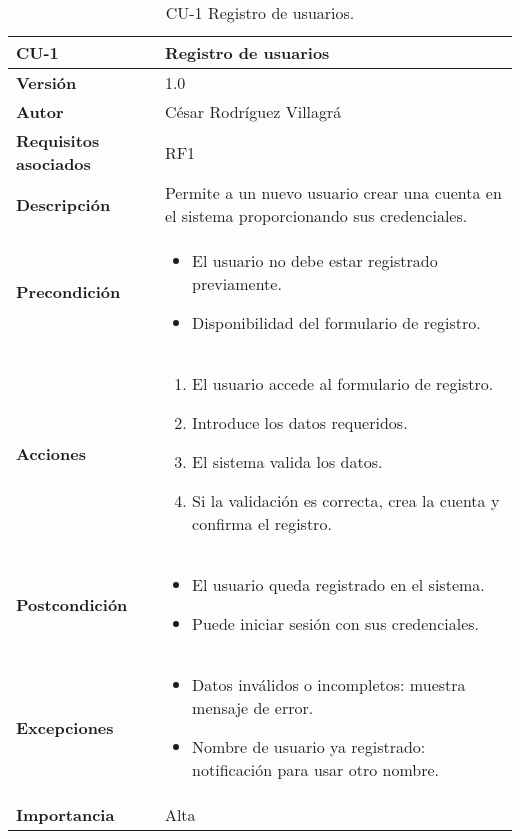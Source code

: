 \begin{table}[p]
	\centering
	\begin{tabularx}{\linewidth}{ p{} p{} }
		\toprule
		\textbf{CU-1}    & \textbf{Registro de usuarios} \\
		\toprule
		\textbf{Versión}              & 1.0    \\
		\textbf{Autor}                & César Rodríguez Villagrá \\
		\textbf{Requisitos asociados} & RF1 \\
		\textbf{Descripción}          & Permite a un nuevo usuario crear una cuenta en el sistema proporcionando sus credenciales. \\
		\textbf{Precondición}         & 
		\begin{itemize}
			\item El usuario no debe estar registrado previamente.
			\item Disponibilidad del formulario de registro.
		\end{itemize} \\
		\textbf{Acciones}             & 
		\begin{enumerate}
			\item El usuario accede al formulario de registro.
			\item Introduce los datos requeridos.
			\item El sistema valida los datos.
			\item Si la validación es correcta, crea la cuenta y confirma el registro.
		\end{enumerate} \\
		\textbf{Postcondición}        & 
		\begin{itemize}
			\item El usuario queda registrado en el sistema.
			\item Puede iniciar sesión con sus credenciales.
		\end{itemize} \\
		\textbf{Excepciones}          & 
		\begin{itemize}
			\item Datos inválidos o incompletos: muestra mensaje de error.
			\item Nombre de usuario ya registrado: notificación para usar otro nombre.
		\end{itemize} \\
		\textbf{Importancia}          & Alta \\
		\bottomrule
	\end{tabularx}
	\caption{CU-1 Registro de usuarios.}
\end{table}


